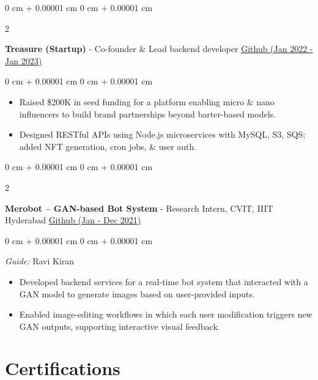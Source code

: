 \documentclass[10pt, a4paper]{article}
\newenvironment{highlights}{
    \begin{itemize}[
        topsep=0.10 cm,
        parsep=0.10 cm,
        partopsep=0pt,
        itemsep=0pt,
        leftmargin=0 cm + 10pt
    ]
}{
    \end{itemize}
} %
\newenvironment{onecolentry}{
    \begin{adjustwidth}{
        0 cm + 0.00001 cm
    }{
        0 cm + 0.00001 cm
    }
}{
    \end{adjustwidth}
} %
\newenvironment{twocolentry}[2][]{
    \onecolentry
    \def\secondColumn{#2}
    \setcolumnwidth{\fill, 6.0 cm}
    \begin{paracol}{2}
}{
    \switchcolumn \raggedleft \secondColumn
    \end{paracol}
    \endonecolentry
} %
\begin{document}
        \vspace{0.15 cm}

        \begin{twocolentry}{
            \href{https://github.com/ammrit2312/treasure-server}{Github (Jan 2022 - Jan 2023)}
        }
            \textbf{Treasure (Startup)} - Co-founder \& Lead backend developer\end{twocolentry}

        \vspace{0.10 cm}
        \begin{onecolentry}
            \begin{highlights}
                \item Raised \$200K in seed funding for a platform enabling micro \& nano influencers to build brand partnerships beyond barter-based models.
                \item Designed RESTful APIs using Node.js microservices with MySQL, S3, SQS; added NFT generation, cron jobs, \& user auth. 
            \end{highlights}
        \end{onecolentry}


        \vspace{0.15 cm}

        \begin{twocolentry}{
            \href{https://github.com/ammrit2312/Merobot/tree/master}{Github (Jan - Dec 2021)}
        }
            \textbf{Merobot – GAN-based Bot System} - Research Intern, CVIT, IIIT Hyderabad\end{twocolentry}

        \vspace{0.10 cm}
        \begin{onecolentry}
            \textit{Guide:} Ravi Kiran\\
            \begin{highlights}
                \item Developed backend services for a real-time bot system that interacted with a GAN model to generate images based on user-provided inputs.
                \item Enabled image-editing workflows in which each user modification triggers new GAN outputs, supporting interactive visual feedback.
            \end{highlights}
        \end{onecolentry}

    \section{Certifications}
\end{document}
